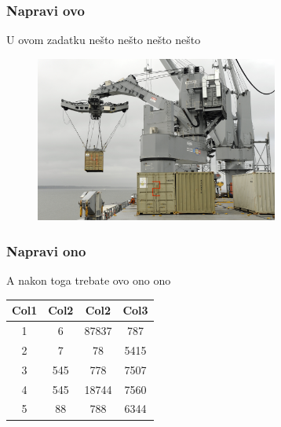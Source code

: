 \documentclass[class=article, crop=false]{standalone}
\begin{document}
\subsubsection{Napravi ovo}

U ovom zadatku nešto nešto nešto nešto


\begin{figure}[h]
	\centering
	\includegraphics[width=8cm]{navy.jpg}
\end{figure}


\subsubsection{Napravi ono}

A nakon toga trebate ovo ono ono


\begin{center}
	\begin{tabular}{||c c c c||} 
		\hline
		Col1 & Col2 & Col2 & Col3 \\ [0.5ex] 
		\hline\hline
		1 & 6 & 87837 & 787 \\ 
		\hline
		2 & 7 & 78 & 5415 \\
		\hline
		3 & 545 & 778 & 7507 \\
		\hline
		4 & 545 & 18744 & 7560 \\
		\hline
		5 & 88 & 788 & 6344 \\ [1ex] 
		\hline
	\end{tabular}
\end{center}
\end{document}
